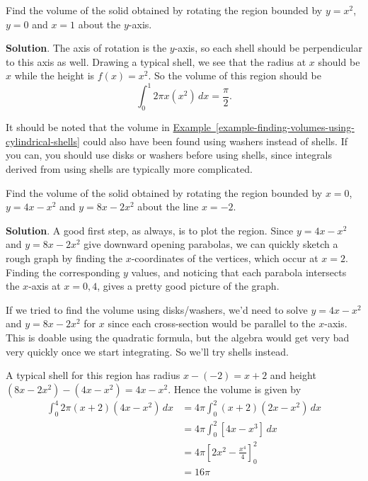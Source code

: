 \documentclass[10pt,]{book}
\theoremstyle{ptxplainnotitle}
\theoremstyle{ptxplaintitle}
\theoremstyle{ptxplainnotitle}
\theoremstyle{ptxplaintitle}
\theoremstyle{ptxplainnotitle}
\theoremstyle{ptxplaintitle}
\theoremstyle{ptxdefinitionnotitle}
\theoremstyle{ptxdefinitiontitle}
\theoremstyle{ptxdefinitionnotitle}
\theoremstyle{ptxdefinitiontitle}
\theoremstyle{ptxdefinitionnotitle}
\theoremstyle{ptxdefinitiontitle}
\theoremstyle{ptxdefinitionnotitle}
\theoremstyle{ptxdefinitiontitle}
\theoremstyle{ptxdefinitionnotitle}
\theoremstyle{ptxdefinitiontitle}
\numberwithin{equation}{section}
\newcommand{\amp}{&}
\begin{document}
\begin{example}\label{example-finding-volumes-using-cylindrical-shells}
\hypertarget{p-642}{}%
Find the volume of the solid obtained by rotating the region bounded by \(y = x^{2}\), \(y = 0\) and \(x = 1\) about the \(y\)-axis.%
\par\smallskip%
\noindent\textbf{Solution}.\hypertarget{solution-140}{}\quad%
\hypertarget{p-643}{}%
The axis of rotation is the \(y\)-axis, so each shell should be perpendicular to this axis as well. Drawing a typical shell, we see that the radius at \(x\) should be \(x\) while the height is \(f(x) = x^{2}\). So the volume of this region should be%
\begin{equation*}
\int_{0}^{1}2\pi x(x^{2})\,dx = \frac{\pi}{2}.
\end{equation*}
%
\end{example}
\hypertarget{p-644}{}%
It should be noted that the volume in \hyperref[example-finding-volumes-using-cylindrical-shells]{Example~\ref{example-finding-volumes-using-cylindrical-shells}} could also have been found using washers instead of shells. If you can, you should use disks or washers before using shells, since integrals derived from using shells are typically more complicated.%
\begin{example}\label{example-cylindrical-shells-2}
\hypertarget{p-645}{}%
Find the volume of the solid obtained by rotating the region bounded by \(x = 0\), \(y = 4x - x^{2}\) and \(y = 8x - 2x^{2}\) about the line \(x = -2\).%
\par\smallskip%
\noindent\textbf{Solution}.\hypertarget{solution-141}{}\quad%
\hypertarget{p-646}{}%
A good first step, as always, is to plot the region. Since \(y = 4x - x^{2}\) and \(y = 8x - 2x^{2}\) give downward opening parabolas, we can quickly sketch a rough graph by finding the \(x\)-coordinates of the vertices, which occur at \(x = 2\). Finding the corresponding \(y\) values, and noticing that each parabola intersects the \(x\)-axis at \(x = 0, 4\), gives a pretty good picture of the graph.%
\par
\hypertarget{p-647}{}%
If we tried to find the volume using disks/washers, we'd need to solve \(y = 4x - x^{2}\) and \(y = 8x - 2x^{2}\) for \(x\) since each cross-section would be parallel to the \(x\)-axis. This is doable using the quadratic formula, but the algebra would get very bad very quickly once we start integrating. So we'll try shells instead.%
\par
\hypertarget{p-648}{}%
A typical shell for this region has radius \(x - (-2) = x + 2\) and height \((8x - 2x^{2}) - (4x - x^{2}) = 4x - x^{2}\). Hence the volume is given by%
\begin{align*}
\int_{0}^{4}2\pi(x + 2)(4x - x^{2})\,dx \amp= 4\pi\int_{0}^{2}(x + 2)(2x - x^{2})\,dx\\
\amp= 4\pi\int_{0}^{2}\left[4x - x^{3}\right]\,dx\\
\amp= 4\pi\left[2x^{2} - \frac{x^{4}}{4}\right]_{0}^{2}\\
\amp= 16\pi
\end{align*}
%
\end{example}
\typeout{************************************************}
\typeout{************************************************}
\end{document}
